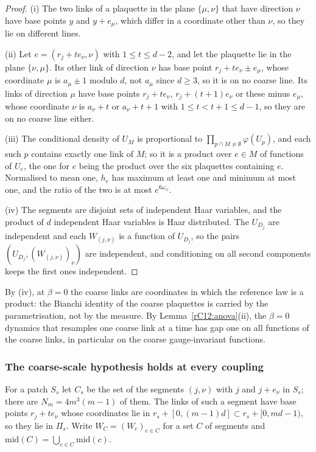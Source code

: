 \begin{proof}
(i) The two links of a plaquette in the plane $\{\mu,\nu\}$ that have
direction $\nu$ have base points $y$ and $y+e_\mu$, which differ in a
coordinate other than $\nu$, so they lie on different lines.

(ii) Let $e=(r_j+te_\nu,\nu)$ with $1\le t\le d-2$, and let the plaquette lie
in the plane $\{\nu,\mu\}$. Its other link of direction $\nu$ has base point
$r_j+te_\nu\pm e_\mu$, whose coordinate $\mu$ is $a_\mu\pm1$ modulo $d$, not
$a_\mu$ since $d\ge3$, so it is on no coarse line. Its links of direction
$\mu$ have base points $r_j+te_\nu$, $r_j+(t+1)e_\nu$ or these minus $e_\mu$,
whose coordinate $\nu$ is $a_\nu+t$ or $a_\nu+t+1$ with $1\le t<t+1\le d-1$,
so they are on no coarse line either.

(iii) The conditional density of $U_M$ is proportional to $\prod_{p\cap M\ne
\emptyset}\varphi(U_p)$, and each such $p$ contains exactly one link of $M$;
so it is a product over $e\in M$ of functions of $U_e$, the one for $e$ being
the product over the six plaquettes containing $e$. Normalised to
mean one, $h_e$ has maximum at least one and minimum at most one, and the
ratio of the two is at most $e^{6\omega_\varphi}$.

(iv) The segments are disjoint sets of independent Haar variables, and the
product of $d$ independent Haar variables is Haar distributed. The $U_{D_j}$
are independent and each $W_{(j,\nu)}$ is a function of $U_{D_j}$, so the
pairs $(U_{D_j},(W_{(j,\nu)})_\nu)$ are independent, and conditioning on all
second components keeps the first ones independent.
\end{proof}

By (iv), at $\beta=0$ the coarse links are coordinates in which the reference
law is a product: the Bianchi identity of the coarse plaquettes is carried
by the parametrisation, not by the measure. By
Lemma~\ref{rC12:anova}(ii), the $\beta=0$ dynamics that resamples one
coarse link at a time has gap one on all functions of the coarse links, in
particular on the coarse gauge-invariant functions.

\subsubsection{The coarse-scale hypothesis holds at every coupling}

For a patch $S_s$ let $C_s$ be the set of the segments $(j,\nu)$ with $j$ and
$j+e_\nu$ in $S_s$; there are $N_m=4m^3(m-1)$ of them. The links of such a
segment have base points $r_j+te_\nu$ whose coordinates lie in $r_s+[0,
(m-1)d]\subset r_s+[0,md-1)$, so they lie in $\Pi_s$. Write $W_{C}=(W_c)_{c\in
C}$ for a set $C$ of segments and $\mathrm{mid}(C)=\bigcup_{c\in C}
\mathrm{mid}(c)$.

